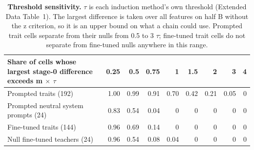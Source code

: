 \begin{table}[tp]
\caption{\textbf{Threshold sensitivity.} $\tau$ is each induction method's own threshold (Extended Data Table~1). The largest difference is taken over all features on half B without the z criterion, so it is an upper bound on what a chain could use. Prompted trait cells separate from their nulls from 0.5 to 3 $\tau$; fine-tuned trait cells do not separate from fine-tuned nulls anywhere in this range.}
\label{sitab:10}
{\tabsize\setlength{\tabcolsep}{4pt}
\begin{tabular}{@{}lrrrrrrrr@{}}
\toprule
\textbf{Share of cells whose largest stage-0 difference exceeds m $\times$ $\tau$} & \textbf{0.25} & \textbf{0.5} & \textbf{0.75} & \textbf{1} & \textbf{1.5} & \textbf{2} & \textbf{3} & \textbf{4}\\
\midrule
Prompted traits (192) & 1.00 & 0.99 & 0.91 & 0.70 & 0.42 & 0.21 & 0.05 & 0\\
Prompted neutral system prompts (24) & 0.83 & 0.54 & 0.04 & 0 & 0 & 0 & 0 & 0\\
Fine-tuned traits (144) & 0.96 & 0.69 & 0.14 & 0 & 0 & 0 & 0 & 0\\
Null fine-tuned teachers (24) & 0.96 & 0.54 & 0.08 & 0.04 & 0 & 0 & 0 & 0\\
\bottomrule
\end{tabular}}
\end{table}


